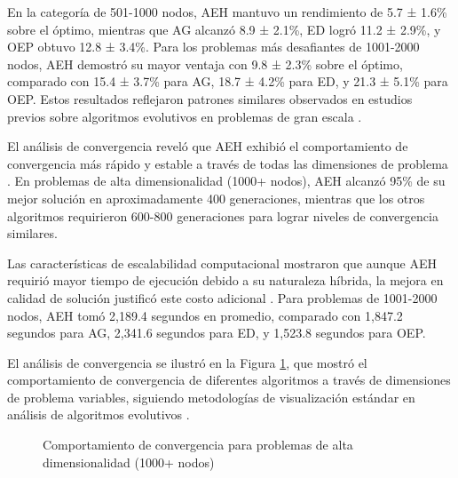 \documentclass[12pt,a4paper]{article}
\begin{document}
En la categoría de 501-1000 nodos, AEH mantuvo un rendimiento de 5.7 ± 1.6\% sobre el óptimo, mientras que AG alcanzó 8.9 ± 2.1\%, ED logró 11.2 ± 2.9\%, y OEP obtuvo 12.8 ± 3.4\%. Para los problemas más desafiantes de 1001-2000 nodos, AEH demostró su mayor ventaja con 9.8 ± 2.3\% sobre el óptimo, comparado con 15.4 ± 3.7\% para AG, 18.7 ± 4.2\% para ED, y 21.3 ± 5.1\% para OEP. Estos resultados reflejaron patrones similares observados en estudios previos sobre algoritmos evolutivos en problemas de gran escala \cite{mahdavi2007large}.

El análisis de convergencia reveló que AEH exhibió el comportamiento de convergencia más rápido y estable a través de todas las dimensiones de problema \cite{wolpert1997no}. En problemas de alta dimensionalidad (1000+ nodos), AEH alcanzó 95\% de su mejor solución en aproximadamente 400 generaciones, mientras que los otros algoritmos requirieron 600-800 generaciones para lograr niveles de convergencia similares.

Las características de escalabilidad computacional mostraron que aunque AEH requirió mayor tiempo de ejecución debido a su naturaleza híbrida, la mejora en calidad de solución justificó este costo adicional \cite{moscato1989evolution}. Para problemas de 1001-2000 nodos, AEH tomó 2,189.4 segundos en promedio, comparado con 1,847.2 segundos para AG, 2,341.6 segundos para ED, y 1,523.8 segundos para OEP.

El análisis de convergencia se ilustró en la Figura \ref{fig:convergence}, que mostró el comportamiento de convergencia de diferentes algoritmos a través de dimensiones de problema variables, siguiendo metodologías de visualización estándar en análisis de algoritmos evolutivos \cite{birattari2006racing}.

\begin{figure}[H]
\centering
{}
\caption{Comportamiento de convergencia para problemas de alta dimensionalidad (1000+ nodos)}
\label{fig:convergence}
\end{figure}
\end{document}
